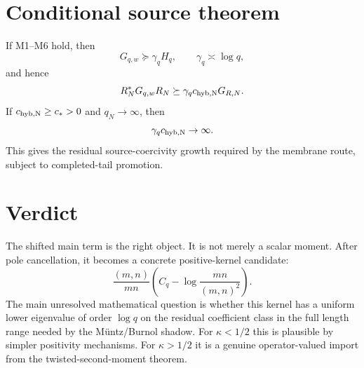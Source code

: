 \documentclass[11pt]{article}
\begin{document}
\section{Conditional source theorem}
If M1--M6 hold, then
\[
G_{q,w}\succeq \gamma_qH_q,
\qquad \gamma_q\asymp \log q,
\]
and hence
\[
R_N^*G_{q,w}R_N
\succeq
\gamma_qc_{\rm hyb,N}G_{R,N}.
\]
If $c_{\rm hyb,N}\ge c_*>0$ and $q_N\to\infty$, then
\[
\gamma_qc_{\rm hyb,N}\to\infty.
\]
This gives the residual source-coercivity growth required by the membrane route, subject to completed-tail promotion.

\section{Verdict}
The shifted main term is the right object.  It is not merely a scalar moment.  After pole cancellation, it becomes a concrete positive-kernel candidate:
\[
\frac{(m,n)}{mn}
\left(C_q-\log\frac{mn}{(m,n)^2}\right).
\]
The main unresolved mathematical question is whether this kernel has a uniform lower eigenvalue of order $\log q$ on the residual coefficient class in the full length range needed by the Müntz/Burnol shadow.  For $\kappa<1/2$ this is plausible by simpler positivity mechanisms.  For $\kappa>1/2$ it is a genuine operator-valued import from the twisted-second-moment theorem.
\end{document}

